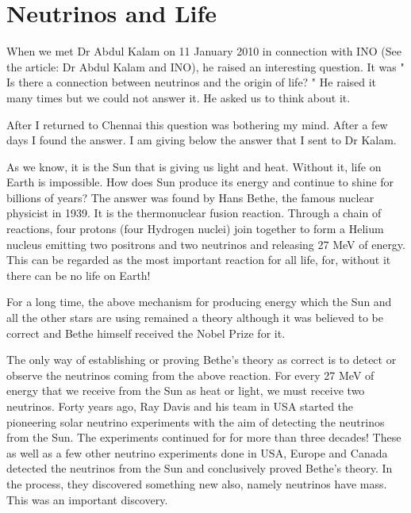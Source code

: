 \chapter{Neutrinos and Life}\label{chap17}

\lhead[\small\thepage]{\small\leftmark}

                 
                 
When we met Dr Abdul Kalam on 11 January 2010 in connection
with INO (See the article: Dr Abdul Kalam and INO), he raised 
an interesting question. It was " Is there a connection between
neutrinos and the origin of life? " He raised it many times but
we could not answer it. He asked us to think about it.

After I returned to Chennai this question was bothering my mind.
After a few days I found the answer. I am giving below the 
answer that I sent to Dr Kalam.

As we know, it is the Sun that is giving us light and heat.
Without it, life on Earth is impossible. How does Sun produce 
its energy and continue to shine for billions of
years? The answer was found by Hans Bethe, the famous
nuclear physicist in 1939. It is the thermonuclear fusion
reaction. Through a chain of reactions, four protons
(four Hydrogen nuclei) join together to form a Helium
nucleus emitting two positrons and two neutrinos and
releasing 27 MeV of energy. This can be regarded as the
most important reaction for all life, for, without it
there can be no life on Earth!

For a long time, the above mechanism for producing energy
which the Sun and all the other stars are using remained
a theory although it was believed to be correct and
Bethe himself received the Nobel Prize for it.

The only way of establishing or proving Bethe's theory 
as correct is to detect or observe the neutrinos coming
from the above reaction. For every 27 MeV of energy that
we receive from the Sun as heat or light, we must receive
two neutrinos. Forty years ago, Ray Davis and his team
in USA started the pioneering solar neutrino
experiments with the aim of detecting the neutrinos from
the Sun. The experiments continued for for more than three
decades! These as well as a few other neutrino experiments
done in USA, Europe and Canada
detected the neutrinos from the Sun and conclusively proved
Bethe's theory. In the process, they discovered something
new also, namely neutrinos have mass. This was an important
discovery.

